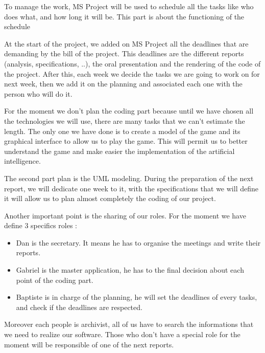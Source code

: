 To manage the work,  MS Project will be used to schedule all the tasks like who does what, and how long it will be.  This part is about the functioning of the schedule
\newline
\newline

At the start of the project, we added on MS Project all the deadlines that are demanding by the bill of the project. This deadlines are the different reports (analysis, specifications, ..), the oral presentation and the rendering of the code of the project. After this, each week we decide the tasks we are going to work on for next week, then we add it on the planning and associated each one with the person who will do it.
\newline
\newline

For the moment we don't plan the coding part because until we have chosen all the technologies we will use, there are many tasks that we can't estimate the length. The only one we have done is to create a model of the game and its graphical interface to allow us to play the game. This will permit us to better understand the game and make easier the implementation of the artificial intelligence.
\newline
\newline

The second part plan is the UML modeling. During the preparation of the next report, we will dedicate one week to it, with the specifications that we will define it will allow us to plan almost completely the coding of our project.
\newline
\newline

Another important point is the sharing of our roles. For the moment we have define 3 specifics roles : 
\begin{itemize}
\item  Dan is the secretary. It means he has to organise the meetings and write their reports.
\item Gabriel is the master application, he has to the final decision about each point of the coding part.
\item Baptiste is in charge of the planning, he will set the deadlines of every tasks, and check if the deadlines are respected.
\end{itemize}
Moreover each people is archivist, all of us have to search the informations that we need to realize our software. Those who don't have a special role for the moment will be responsible of one of the next reports.